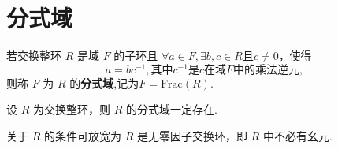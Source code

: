 \documentclass[../../main.tex]{subfiles}%
\begin{document}
\section{分式域}

\begin{definition}[分式域]
若交换整环 \( R \) 是域 \( F \) 的子环且 \( \forall a \in F, \exists b, c \in R \)且$c\neq 0$，使得
\[
a=bc^{-1},\text{其中}c^{-1}\text{是}c\text{在域}F\text{中的乘法逆元},
\]
则称 \( F \) 为 \( R \) 的\textbf{分式域},记为$F=\mathrm{Frac}\left( R \right)$.
\end{definition}

\begin{theorem}\label{theorem:抽象代数--定理2.1.1}
设 \( R \) 为交换整环，则 \( R \) 的分式域一定存在.
\end{theorem}
\begin{remark}
关于 \( R \) 的条件可放宽为 \( R \) 是无零因子交换环，即 \( R \) 中不必有幺元.
\end{remark}
\end{document}
